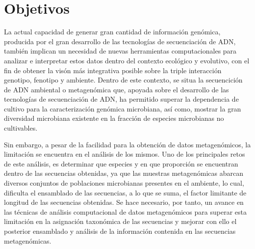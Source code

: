 \documentclass{article}
\title {}
\author{Pérez Villarroya, David }
\begin{document}
\maketitle{}


\section {Objetivos}

La actual capacidad de generar gran cantidad de información genómica, producida por el gran desarrollo de las tecnologías de secuenciación de ADN, también implican un necesidad de nuevas herramientas computacionales para analizar e interpretar estos datos dentro del contexto ecológico y evolutivo, con el fin de obtener la visón más integrativa posible sobre la triple interacción genotipo, fenotipo y ambiente. Dentro de este contexto, se situa la secuencición de ADN ambiental o metagenómica que, apoyada sobre el desarrollo de las tecnologías de secuenciación de ADN, ha permitido superar la dependencia de cultivo para la caracterización genómica microbiana, así como, mostrar la gran diversidad microbiana existente en la fracción de especies microbianas no cultivables.

Sin embargo, a pesar de la facilidad para la obtención de datos metagenómicos, la limitación se encuentra en el análisis de los mismos. Uno de los principales retos de este análisis, es determinar que especies y en que proporción se encuentran dentro de las secuencias obtenidas, ya que las muestras metagenómicas abarcan diversos conjuntos de poblaciones microbianas presentes en el ambiente, lo cual, dificulta el ensamblado de las secuencias, a lo que se suma, el factor limitante de longitud de las secuencias obtenidas. Se hace necesario, por tanto, un avance en las técnicas de análisis computacional de datos metagenómicos para superar esta limitación en la asignación taxonómica de las secuencias y mejorar con ello el posterior ensamblado y análisis de la información contenida en las secuencias metagenómicas.
\end{document}
